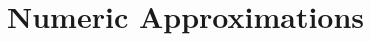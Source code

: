\documentclass[../fem.tex]{subfile}
\begin{document}
\section{Numeric Approximations}%
\label{sec:numeric_approximations}
\end{document}
